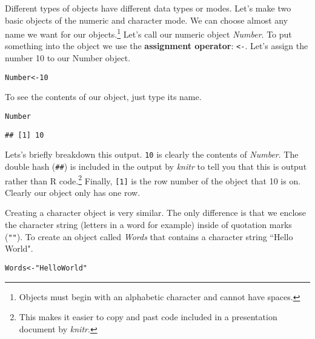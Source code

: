 \documentclass[ChapterTOCs,krantz1]{krantz}\usepackage{graphicx, color}
\makeatletter
\newcommand{\hlstring}[1]{\textcolor[rgb]{0.6,0.6,1}{#1}}%
\newenvironment{kframe}{%
 \def\at@end@of@kframe{}%
 \ifinner\ifhmode%
  \def\at@end@of@kframe{\end{minipage}}%
  \begin{minipage}{\columnwidth}%
 \fi\fi%
 \def\FrameCommand##1{\hskip\@totalleftmargin \hskip-\fboxsep
 \colorbox{shadecolor}{##1}\hskip-\fboxsep
     \hskip-\linewidth \hskip-\@totalleftmargin \hskip\columnwidth}%
 \MakeFramed {\advance\hsize-\width
   \@totalleftmargin\z@ \linewidth\hsize
   \@setminipage}}%
 {\par\unskip\endMakeFramed%
 \at@end@of@kframe}
\newenvironment{knitrout}{}{} %
\makeatother
\begin{document}
Different types of objects have different data types or modes. Let's make two basic objects of the numeric and character mode. We can choose almost any name we want for our objects.\footnote{Objects must begin with an alphabetic character and cannot have spaces.} Let's call our numeric object {\emph{Number}}. To put something into the object we use the {\bf{assignment operator}}: {\tt{\textless -}}. Let's assign the number 10 to our Number object.

\begin{knitrout}
\color{fgcolor}\begin{kframe}
\begin{alltt}
Number <- 10
\end{alltt}
\end{kframe}
\end{knitrout}


\noindent To see the contents of our object, just type its name.

\begin{knitrout}
\color{fgcolor}\begin{kframe}
\begin{alltt}
Number
\end{alltt}
\begin{verbatim}
## [1] 10
\end{verbatim}
\end{kframe}
\end{knitrout}


\noindent Lets's briefly breakdown this output. \texttt{10} is clearly the contents of {\emph{Number}}. The double hash (\texttt{\#\#}) is included in the output by {\emph{knitr}} to tell you that this is output rather than R code.\footnote{This makes it easier to copy and past code included in a presentation document by {\emph{knitr}}.} Finally, \texttt{[1]} is the row number of the object that 10 is on. Clearly our object only has one row.   

Creating a character object is very similar. The only difference is that we enclose the character string (letters in a word for example) inside of quotation marks ({\tt{""}}). To create an object called {\emph{Words}} that contains a character string ``Hello World".

\begin{knitrout}
\color{fgcolor}\begin{kframe}
\begin{alltt}
Words <- \hlstring{"Hello World"}
\end{alltt}
\end{kframe}
\end{knitrout}
\end{document}

